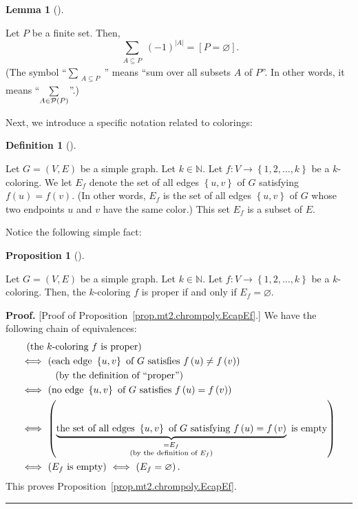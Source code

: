 \documentclass[numbers=enddot,12pt,final,onecolumn,notitlepage]{scrartcl}%
\theoremstyle{definition}
\newtheorem{lem}[theo]{Lemma}
\newenvironment{lemma}[1][]
{\begin{lem}[#1]\begin{leftbar}}
{\end{leftbar}\end{lem}}
\newtheorem{prop}[theo]{Proposition}
\newenvironment{proposition}[1][]
{\begin{prop}[#1]\begin{leftbar}}
{\end{leftbar}\end{prop}}
\newtheorem{defi}[theo]{Definition}
\newenvironment{definition}[1][]
{\begin{defi}[#1]\begin{leftbar}}
{\end{leftbar}\end{defi}}
\newenvironment{proof}[1][Proof]{\noindent\textbf{#1.} }{\ \rule{0.5em}{0.5em}}
\let\sumnonlimits\sum
\renewcommand{\sum}{\sumnonlimits\limits}
\newcommand{\NN}{\mathbb{N}}
\newcommand{\powset}[2][]{\ifthenelse{\equal{#2}{}}{\mathcal{P}\left(#1\right)}{\mathcal{P}_{#1}\left(#2\right)}}
\newcommand{\set}[1]{\left\{ #1 \right\}}
\newcommand{\abs}[1]{\left| #1 \right|}
\newcommand{\tup}[1]{\left( #1 \right)}
\newcommand{\ive}[1]{\left[ #1 \right]}
\begin{document}
\begin{lemma} \label{lem.dominating.heinrich-lemma1}
Let $P$ be a finite set. Then,
\[
\sum_{\substack{A \subseteq P}} \tup{-1}^{\abs{A}}
= \ive{P = \varnothing} .
\]
(The symbol ``$\sum_{\substack{A \subseteq P}}$'' means ``sum over
all subsets $A$ of $P$''. In other words, it means
``$\sum_{\substack{A \in \powset{P}}}$''.)
\end{lemma}

Next, we introduce a specific notation related to colorings:

\begin{definition}
\label{def.mt2.chrompoly.Ef}
Let $G = \tup{V, E}$ be a simple graph.
Let $k \in \NN$.
Let $f : V \to \set{1, 2, \ldots, k}$ be a $k$-coloring.
We let $E_f$ denote the set of all edges $\set{u, v}$ of $G$
satisfying $f \tup{u} = f \tup{v}$.
(In other words, $E_f$ is the set of all edges $\set{u, v}$ of
$G$ whose two endpoints $u$ and $v$ have the same color.)
This set $E_f$ is a subset of $E$.
\end{definition}

Notice the following simple fact:

\begin{proposition}
\label{prop.mt2.chrompoly.EcapEf}
Let $G = \tup{V, E}$ be a simple graph.
Let $k \in \NN$.
Let $f : V \to \set{1, 2, \ldots, k}$ be a $k$-coloring.
Then, the $k$-coloring $f$ is proper if and only if
$E_f = \varnothing$.
\end{proposition}

\begin{proof}
[Proof of Proposition~\ref{prop.mt2.chrompoly.EcapEf}.]
We have the following chain of equivalences:
\begin{align*}
&  \ \left(  \text{the }k\text{-coloring }f\text{ is proper}\right) \\
&  \Longleftrightarrow\ \left(  \text{each edge } \set{u, v} \text{
of }G\text{ satisfies }f\left(  u\right)  \neq f\left(  v\right)  \right) \\
&  \ \ \ \ \ \ \ \ \ \ \left(  \text{by the definition of \textquotedblleft
proper\textquotedblright}\right) \\
&  \Longleftrightarrow\ \left(  \text{no edge } \set{u, v} \text{ of
}G\text{ satisfies }f\left(  u\right)  =f\left(  v\right)  \right) \\
&  \Longleftrightarrow\ \left(  \underbrace{\text{the set of all edges
} \set{u, v} \text{ of }G\text{ satisfying }f\left(  u\right)
=f\left(  v\right)  }_{\substack{=E_f \\\text{(by the definition of }%
E_f \text{)}}}\text{ is empty}\right) \\
&  \Longleftrightarrow\ \left(  E_f \text{ is empty}\right)
\ \Longleftrightarrow\ \left(  E_f =\varnothing\right)  .
\end{align*}
This proves Proposition~\ref{prop.mt2.chrompoly.EcapEf}.
\end{proof}
\end{document}
